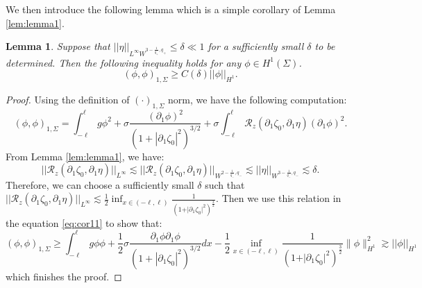 \documentclass[letterpaper,reqno,10pt,twoside]{amsart}
\newtheorem{lemma}[theorem]{Lemma}
\theoremstyle{definition}
\theoremstyle{remark}
\def\p{\partial}
\begin{document}
	We then introduce the following lemma which is a simple corollary of Lemma \ref{lem:lemma1}.  
	
	\begin{lemma}{\label{cor:cor1}}
		Suppose that $\vert \vert \eta\vert \vert_{L^{\infty}W^{3-\frac{1}{q_{+}},q_{+}}}\leq \delta\ll1$ for a sufficiently small $\delta$ to be determined. Then the following inequality holds for any $\phi\in H^{1}(\Sigma)$.
		\[
		(\phi,\phi)_{1,\Sigma}\geq C(\delta)\vert \vert \phi\vert \vert_{H^{1}}.
		\]
	\end{lemma}
	
	\begin{proof}
		Using the definition of $(\cdot)_{1,\Sigma}$ norm, we have the following computation:
		\[
		(\phi,\phi)_{1,\Sigma}=\int_{-\ell}^{\ell}g\phi^2+\sigma\frac{(\p_1\phi)^2}{(1+|\p_1\zeta_0|^2)^{3/2}}+\sigma\int_{-\ell}^{\ell}\mathcal{R}_{z}(\partial_{1}\zeta_{0},\partial_{1}\eta)(\partial_{1}\phi)^2.\label{eq:cor11}
		\]
		\noindent From Lemma \ref{lem:lemma1}, we have:
		\[
		\vert \vert \mathcal{R}_{z}(\partial_{1}\zeta_{0},\partial_{1}\eta)\vert \vert_{L^{\infty}}\lesssim \vert \vert \mathcal{R}_{z}(\partial_{1}\zeta_{0},\partial_{1}\eta)\vert \vert_{W^{2-\frac{1}{q_{-}},q_{-}}}\lesssim \vert \vert \eta\vert \vert_{W^{3-\frac{1}{q_{-}},q_{-}}}\lesssim \delta.
		\]
		\noindent Therefore, we can choose a sufficiently small $\delta$ such that $
		\vert \vert \mathcal{R}_{z}(\partial_{1}\zeta_{0},\partial_{1}\eta)\vert \vert_{L^{\infty}}\lesssim \frac{1}{2}\inf_{x\in (-\ell,\ell)}\frac{1}{(1+\vert \partial_{1}\zeta_{0}\vert^{2})^{\frac{3}{2}}}$. Then we use this relation in the equation \eqref{eq:cor11} to show that:
		\[
		(\phi,\phi)_{1,\Sigma}\geq \int_{-\ell}^{\ell}g\phi\phi+\frac{1}{2}\sigma\frac{\p_1\phi\p_1\phi}{(1+|\p_1\zeta_0|^2)^{3/2}}dx-\frac{1}{2}\inf_{x\in (-\ell,\ell)}\frac{1}{(1+\vert \partial_{1}\zeta_{0}\vert^{2})^{\frac{3}{2}}}\|\phi\|_{H^{1}}^{2}\gtrsim \vert \vert \phi\vert \vert_{H^{1}}
		\]
		\noindent which finishes the proof.
	\end{proof}
	
\end{document}
